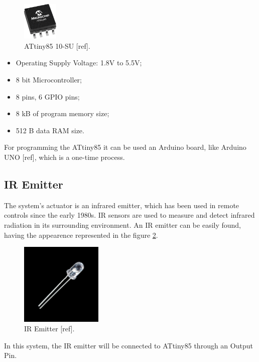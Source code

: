 \documentclass[12pt, letterpaper]{report}
\begin{document}
\begin{figure}[ht]
	\centering
	\includegraphics[width=0.15\textwidth]{attiny}
	\caption{ATtiny85 10-SU [ref].}
	\label{fig:attiny}
\end{figure}

\begin{itemize}
	\item Operating Supply Voltage: 1.8V to 5.5V;
	\item 8 bit Microcontroller;
	\item 8 pins, 6 GPIO pins;
	\item 8 kB of program memory size;
	\item 512 B data RAM size.
\end{itemize}

For programming the ATtiny85 it can be used an Arduino board, like Arduino UNO [ref], which is a one-time process.

\subsection{IR Emitter}
The system’s actuator is an infrared emitter, which has been used in remote controls since the early 1980s. IR sensors are used to measure and detect infrared radiation in its surrounding environment. An IR emitter can be easily found, having the appearence represented in the figure \ref{fig:iremitter}.

\begin{figure}[ht]
	\centering
	\includegraphics[width=0.35\textwidth]{iremitter}
	\caption{IR Emitter [ref].}
	\label{fig:iremitter}
\end{figure}

In this system, the IR emitter will be connected to ATtiny85 through an Output Pin.
\end{document}
